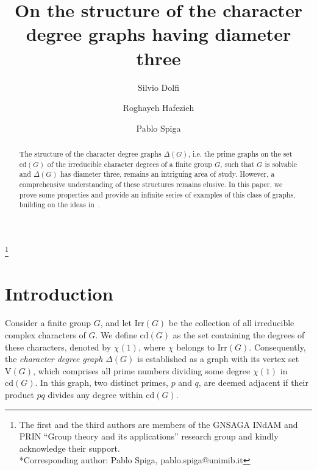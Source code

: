 \documentclass{amsart}
\def\V#1{\mathrm{V}(#1)}
\begin{document}
	
	\title[Diameter three]{On the structure of the character degree graphs having diameter three}
	
	
	\author[S.~Dolfi]{Silvio Dolfi}
	\address{Silvio Dolfi, Dipartimento di Matematica e Informatica U. Dini
Universit\`a degli Studi di Firenze, viale Morgagni 67/a, 50134 Firenze, Italy}
	

	\author[R.~Hafezieh]{Roghayeh Hafezieh}
	\address{Roghayeh Hafezieh, Department of Mathematics, Gebze Technical University, P.O. Box 41400, Gebze, Turkey}
		
	
	\author[P. Spiga]{Pablo Spiga}
	\address{Pablo Spiga, Dipartimento di Matematica Pura e Applicata,\newline
		University of Milano-Bicocca, Via Cozzi 55, 20126 Milano, Italy}
	\thanks{The first and the third authors are members of the GNSAGA INdAM and PRIN ``Group theory and its applications'' research group and kindly acknowledge their support.\\
	*Corresponding author: Pablo Spiga, pablo.spiga@unimib.it}
	\maketitle


        \begin{abstract}
          The structure of the character degree graphs $\Delta(G)$, i.e. the prime graphs on the set $\mathrm{cd}(G)$ of the irreducible character degrees
          of a finite group $G$, such that $G$ is  solvable  and $\Delta(G)$ has diameter three, remains an intriguing area of study. However, a comprehensive understanding of these structures remains elusive. In this paper, we prove some properties and provide an infinite series of examples of this class of graphs, building on the ideas in~\cite{lewis1}.
	\end{abstract}

\section{Introduction}\label{sec:intro}
Consider a finite group $G$, and let $\mathrm{Irr}(G)$ be the collection of all irreducible complex characters of $G$. We define $\mathrm{cd}(G)$ as the set containing the degrees of these characters, denoted by $\chi(1)$, where $\chi$ belongs to $\mathrm{Irr}(G)$. Consequently, the \emph{character degree graph} $\Delta(G)$ is established as a graph with its vertex set $\V G$, which comprises all prime numbers dividing some degree $\chi(1)$ in $\mathrm{cd}(G)$. In this graph, two distinct primes, $p$ and $q$, are deemed adjacent if their product $pq$ divides any degree within $\mathrm{cd}(G)$.
\end{document}
